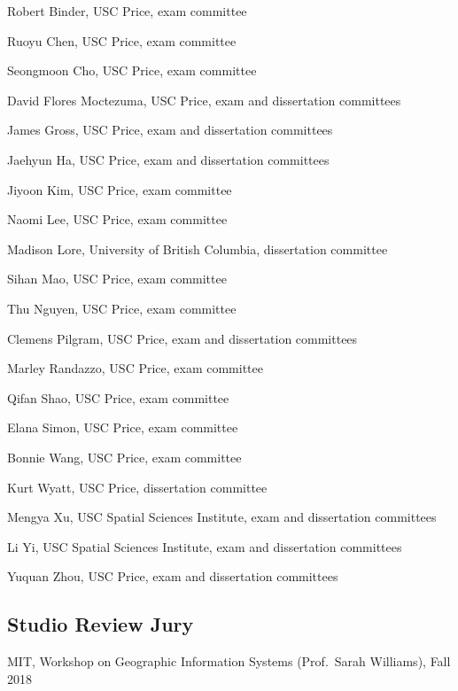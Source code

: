 \documentclass[11pt,a4paper]{report} %
\newcommand{\listitemspace}{0.25em}
\renewenvironment{itemize}
{
  \begin{list}{}{\setlength{\leftmargin}{0em}
      \setlength{\parskip}{0em}
      \setlength{\itemsep}{\listitemspace}
  \setlength{\parsep}{\listitemspace}}}
  {
\end{list}}
\begin{document}
\begin{itemize}

  \item Robert Binder, USC Price, exam committee
  \item Ruoyu Chen, USC Price, exam committee
  \item Seongmoon Cho, USC Price, exam committee
  \item David Flores Moctezuma, USC Price, exam and dissertation committees
  \item James Gross, USC Price, exam and dissertation committees
  \item Jaehyun Ha, USC Price, exam and dissertation committees
  \item Jiyoon Kim, USC Price, exam committee
  \item Naomi Lee, USC Price, exam committee
  \item Madison Lore, University of British Columbia, dissertation committee
  \item Sihan Mao, USC Price, exam committee
  \item Thu Nguyen, USC Price, exam committee
  \item Clemens Pilgram, USC Price, exam and dissertation committees
  \item Marley Randazzo, USC Price, exam committee
  \item Qifan Shao, USC Price, exam committee
  \item Elana Simon, USC Price, exam committee
  \item Bonnie Wang, USC Price, exam committee
  \item Kurt Wyatt, USC Price, dissertation committee
  \item Mengya Xu, USC Spatial Sciences Institute, exam and dissertation committees
  \item Li Yi, USC Spatial Sciences Institute, exam and dissertation committees
  \item Yuquan Zhou, USC Price, exam and dissertation committees

\end{itemize}

\subsection*{Studio Review Jury}

\begin{itemize}

  \item MIT, Workshop on Geographic Information Systems (Prof.\ Sarah Williams), Fall 2018

\end{itemize}
\end{document}
